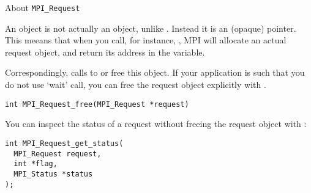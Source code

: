  {About \texttt{MPI\_Request}}
\label{ref:mpirequest}

An  object is not actually an object,
unlike . Instead it is an (opaque) pointer.
This meeans that when you call, for instance, ,
MPI will allocate an actual request object, and return its
address in the  variable.

Correspondingly, calls to  or 
free this object.
If your application is such that you do not use `wait' call, you can free the
request object explicitly
with .
\begin{verbatim}
int MPI_Request_free(MPI_Request *request)
\end{verbatim}

You can inspect the status of a request without freeing the request object
with :
\begin{verbatim}
int MPI_Request_get_status(
  MPI_Request request,
  int *flag,
  MPI_Status *status
);
\end{verbatim}


\endinput



